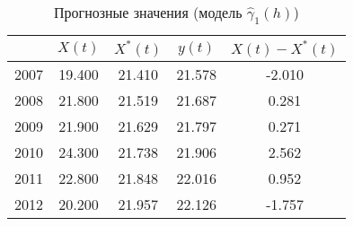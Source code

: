 \begin{table}[ht]
\centering
\begin{tabular}{r|cccc}
  \hline
 & $X(t)$ & $X^{*}(t)$ & $y(t)$ & $ X(t) - X^{*}(t) $ \\ 
  \hline
2007 & 19.400 & 21.410 & 21.578 & -2.010 \\ 
  2008 & 21.800 & 21.519 & 21.687 & 0.281 \\ 
  2009 & 21.900 & 21.629 & 21.797 & 0.271 \\ 
  2010 & 24.300 & 21.738 & 21.906 & 2.562 \\ 
  2011 & 22.800 & 21.848 & 22.016 & 0.952 \\ 
  2012 & 20.200 & 21.957 & 22.126 & -1.757 \\ 
   \hline
\end{tabular}
\caption{Прогнозные значения (модель $ \widehat{\gamma}_1(h) $)} 
\label{table:lin-prediction}
\end{table}
